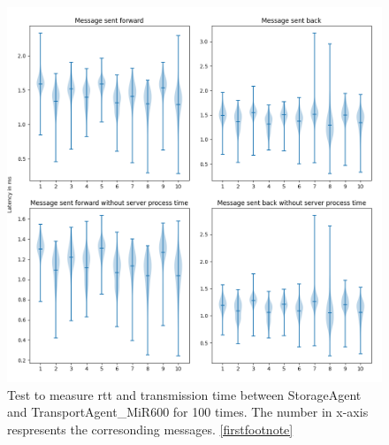 \begin{figure}[htb]
    \includegraphics[width=\textwidth]{figures/appendix/usecase/violin_StorageAgent_to_TransportAgent_MiR600.png}
    \centering
    \caption{Test to measure \gls{rtt} and transmission time between StorageAgent and 
    TransportAgent\_MiR600 for 100 times. The number in x-axis respresents the 
    corresonding messages. \protect\ref{firstfootnote}}
    \label{fig: violin-ST-T600}
\end{figure}

